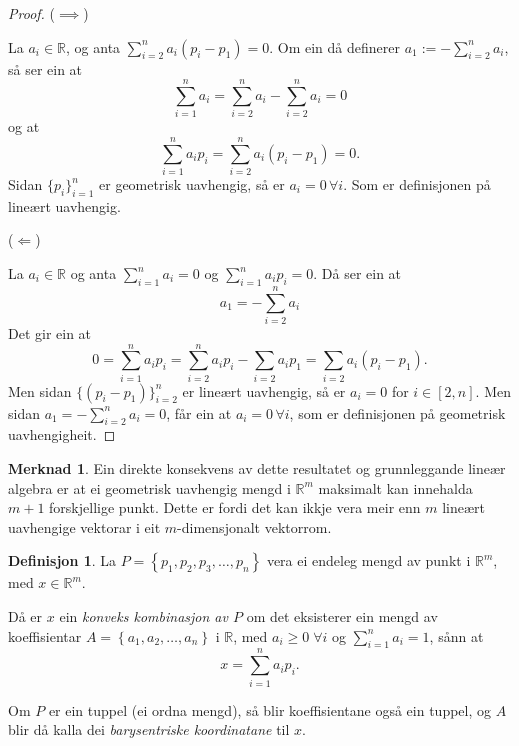 \documentclass[a4paper, 12pt, norsk]{article}
\theoremstyle{plain}
\theoremstyle{definition}
\newtheorem{definition}[theorem]{Definisjon}
\newtheorem{remark}[theorem]{Merknad}
\newcommand{\Rb}{\mathbb{R}}
\newcommand{\set}[1]{ \left\{ #1 \right\} } %
\begin{document}
\begin{proof}
	($\implies$)
		
	La $a_i\in\Rb$, og anta $\sum_{i=2}^na_i(p_i-p_1)=0$. Om ein då definerer $a_1 := -\sum_{i=2}^na_i$, så ser ein at
	\begin{equation*}
		\sum_{i=1}^na_i=\sum_{i=2}^na_i-\sum_{i=2}^na_i=0
	\end{equation*}
	og at 
	\begin{equation*}
		\sum_{i=1}^na_ip_i=\sum_{i=2}^na_i(p_i-p_1)=0.
	\end{equation*}
	Sidan $\{p_i\}_{i=1}^n$ er geometrisk uavhengig, så er $a_i=0 \, \forall i$. Som er definisjonen på lineært uavhengig.
	
	(\(\Longleftarrow\))
	
	La $a_i\in\Rb$ og anta $\sum_{i=1}^n a_i=0$ og $\sum_{i=1}^n a_ip_i=0$. Då ser ein at 
	\begin{equation*}
		a_1=-\sum_{i=2}^n a_i
	\end{equation*} 
	Det gir ein at
	\begin{equation*}
		0=\sum_{i=1}^n a_ip_i=\sum_{i=2}^n a_ip_i-\sum_{i=2}a_ip_1=\sum_{i=2}a_i(p_i-p_1).
	\end{equation*}
	Men sidan $\{(p_i-p_1)\}_{i=2}^n$ er lineært uavhengig, så er $ a_i = 0$ for $i\in[2,n]$. Men sidan $a_1 = -\sum_{i=2}^n a_i=0$, får ein at $a_i=0 \, \forall i$, som er definisjonen på geometrisk uavhengigheit.
\end{proof}

\begin{remark}
	Ein direkte konsekvens av dette resultatet og grunnleggande lineær algebra er at ei geometrisk uavhengig mengd i $\Rb^m$ maksimalt kan innehalda $m+1$ forskjellige punkt. Dette er fordi det kan ikkje vera meir enn $m$ lineært uavhengige vektorar i eit $m$-dimensjonalt vektorrom.
\end{remark}

\begin{definition}
	La \( P = \set{p_1, p_2, p_3, \dots, p_n} \) vera ei endeleg mengd av punkt i \( \Rb^m \), med \( x\in\Rb^m \).

	Då er \( x \) ein \emph{konveks kombinasjon av \( P \)} om det eksisterer ein mengd av koeffisientar \( A=\set{a_1, a_2, \dots, a_n} \) i \( \Rb \), med \( a_i \geq 0 \; \forall i \) og \( \sum_{i=1}^n a_i = 1 \), sånn at
	\[
		x=\sum_{i=1}^n a_ip_i.
	\]
	
	Om $P$ er ein tuppel (ei ordna mengd), så blir koeffisientane også ein tuppel, og $A$ blir då kalla dei \emph{barysentriske koordinatane} til $x$.
\end{definition}
\end{document}
